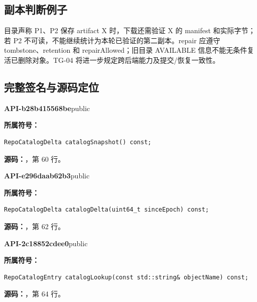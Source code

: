 \subsection{副本判断例子}
目录声称 P1、P2 保存 artifact X 时，下载还需验证 X 的 manifest 和实际字节；若 P2 不可读，不能继续统计为本轮已验证的第二副本。repair 应遵守 tombstone、retention 和 repairAllowed；旧目录 AVAILABLE 信息不能无条件复活已删除对象。TG-04 将进一步规定跨后端能力及提交/恢复一致性。

\subsection{完整签名与源码定位}

\textbf{API-b28b415568be}\quad public\par
\textbf{所属符号：}\par
\begin{Verbatim}[fontsize=\footnotesize,breaklines,breakanywhere]
RepoCatalogDelta catalogSnapshot() const;
\end{Verbatim}
\textbf{源码：}，第 60 行。\par

\textbf{API-e296daab62b3}\quad public\par
\textbf{所属符号：}\par
\begin{Verbatim}[fontsize=\footnotesize,breaklines,breakanywhere]
RepoCatalogDelta catalogDelta(uint64_t sinceEpoch) const;
\end{Verbatim}
\textbf{源码：}，第 62 行。\par

\textbf{API-2c18852cdee0}\quad public\par
\textbf{所属符号：}\par
\begin{Verbatim}[fontsize=\footnotesize,breaklines,breakanywhere]
RepoCatalogEntry catalogLookup(const std::string& objectName) const;
\end{Verbatim}
\textbf{源码：}，第 64 行。\par

